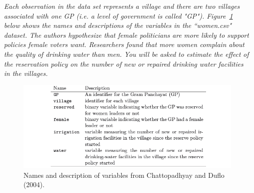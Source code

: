 \documentclass[12pt,letterpaper]{article}
\begin{document}
\noindent \textit{Each observation in the data set represents a village and there are two villages associated with one GP (i.e. a level of government is called "GP"). Figure~\ref{fig:women_desc} below shows the names and descriptions of the variables in the ``women.csv" dataset. The authors hypothesize that female politicians are more likely to support policies female voters want. Researchers found that more women complain about the quality of drinking water than men. You will be asked to estimate the effect of the reservation policy on the number of new or repaired drinking water facilities in the villages.}
\vspace{.5cm}
\begin{figure}[h!]
	\caption{\footnotesize{Names and description of variables from Chattopadhyay and Duflo (2004).}}
	\centering
	\label{fig:women_desc}
	\includegraphics[width=.99\textwidth]{../women_desc}
\end{figure}		
\newpage
\end{document}
